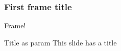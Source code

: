\documentclass{beamer}
\begin{document}
\begin{frame}
    \frametitle{First frame title}
    Frame!
\end{frame}

\begin{frame}{Title as param}
    This slide has a title
\end{frame}
\end{document}
